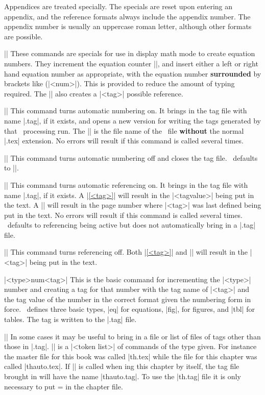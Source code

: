 Appendices are treated specially. The specials  are reset upon entering an
appendix, and the reference formats always include the appendix number. The
appendix number is usually an uppercase roman letter, although other formats
are possible. 

\beginblockmode
\ext\@|\aneq  {}|
\nbr
These commands are specials for use in display math mode to create equation
numbers. They increment the equation counter |\eqnum|, and insert either a
left or right hand equation number as appropriate, with the equation number
{\bf surrounded} by brackets like (|<num>|). This is provided to reduce the
amount of typing required. The || also creates a |<tag>|
possible reference. 

\mbr
\ext\@|\autonumberingon|
\nbr
This command turns automatic numbering on. It brings in the tag file with name
|\jobname.tag|, if it exists, and opens a new version for writing the tags
generated by that \tex\ processing run. The |\jobname| is the file name of
the \tex\ file {\bf without} the normal |.tex| extension.
No errors will result if this command is called several times.

\mbr
\ext\@|\autonumberingoff|
\nbr
This command turns  automatic numbering off and closes the tag file.
\intex\ defaults to |\autonumberingoff|.

\mbr
\ext\@|\autoreferencingon|
\nbr
This command turns automatic referencing on. It brings in the tag file with name
|\jobname.tag|, if it exists. A |\ref{<tag>}| will result in the 
|<tagvalue>| being put in the text. A || will result in the page
number where |<tag>| was last defined being put in the text. 
No errors will result if this command is called several times.
\intex\ defaults to referencing being active but does not automatically bring
in a |.tag| file. 

\mbr
\ext\@|\autoreferencingingoff|
\nbr
This command turns  referencing off.
Both |\ref{<tag>}| and || will result in the 
|<tag>| being put in the text.  


\mbr
\ext\@|\auto<type>num{<tag>}|
\nbr
This is the basic command for incrementing the |<type>| number and creating a
tag for that number with the tag name of |<tag>| and the tag value of the
number in the correct format given the numbering form in force. \intex\
defines three basic types, |eq| for equations, |fig|, for figures, and |tbl|
for tables. The tag is written to the |.tag| file.

\mbr
\ext\@||
\nbr
In some cases it may be useful to bring in a file or list of files
of tags other than those in
|\jobname.tag|. || is a |<token list>| of commands of the type
given. 
For instance the master file for this book was called |th.tex|
while the file for this chapter was called |thauto.tex|. If
|\autonumberingon| is called when \tex ing this chapter by itself, the tag
file brought in will have the name |thauto.tag|. To use the |th.tag| file it
is only necessary to put 
\begintt
{}  = { } in the chapter file. 
\endtt


